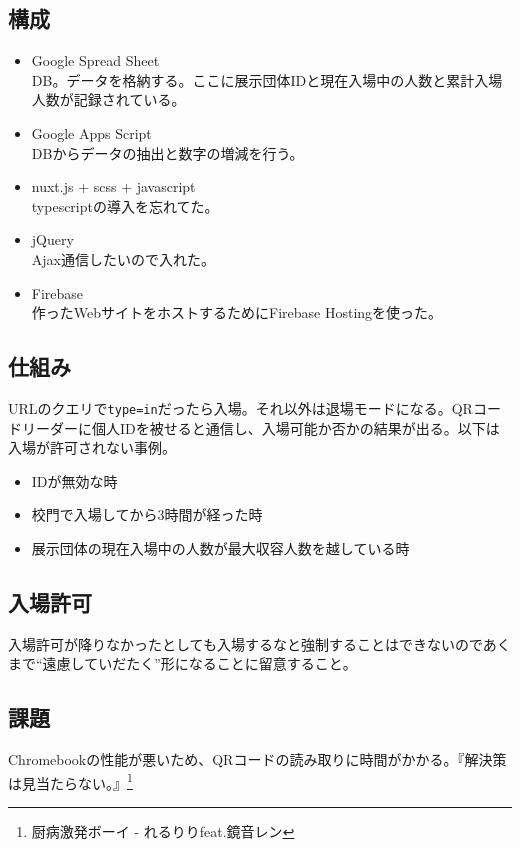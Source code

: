 \documentclass[a4paper]{ltjsreport}
\newcommand{\terlogy}[2][|]{\colorbox{terlogy}{\texttt{\lstinline#1#2#1}}}
\begin{document}
\subsection{構成}
\begin{itemize}
  \item Google Spread Sheet\\
        DB。データを格納する。ここに展示団体IDと現在入場中の人数と累計入場人数が記録されている。
  \item Google Apps Script\\
        DBからデータの抽出と数字の増減を行う。
  \item nuxt.js + scss + javascript\\
        typescriptの導入を忘れてた。
  \item jQuery\\
        Ajax通信したいので入れた。
  \item Firebase\\
        作ったWebサイトをホストするためにFirebase Hostingを使った。
\end{itemize}

\subsection{仕組み}
URLのクエリで\terlogy{type=in}だったら入場。それ以外は退場モードになる。QRコードリーダーに個人IDを被せると通信し、入場可能か否かの結果が出る。以下は入場が許可されない事例。
\begin{itemize}
  \item IDが無効な時
  \item 校門で入場してから3時間が経った時
  \item 展示団体の現在入場中の人数が最大収容人数を越している時
\end{itemize}

\subsection{入場許可}
入場許可が降りなかったとしても入場するなと強制することはできないのであくまで``遠慮していだたく''形になることに留意すること。

\subsection{課題}
Chromebookの性能が悪いため、QRコードの読み取りに時間がかかる。『解決策は見当たらない。』\footnote{厨病激発ボーイ - れるりりfeat.鏡音レン}
\end{document}
